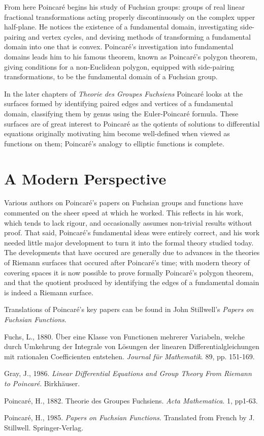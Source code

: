 \documentclass[12pt]{article}
\begin{document}
From here Poincar\'e begins his study of Fuchsian groups: groups of real linear fractional transformations acting properly discontinuously on the complex upper half-plane. He notices the existence of a fundamental domain, investigating side-pairing and vertex cycles, and devising methods of transforming a fundamental domain into one that is convex. Poincar\'e's investigation into fundamental domains leads him to his famous theorem, known as Poincar\'e's polygon theorem, giving conditions for a non-Euclidean polygon, equipped with side-pairing transformations, to be the fundamental domain of a Fuchsian group.

In the later chapters of \emph{Theorie des Groupes Fuchsiens} Poincar\'e looks at the surfaces formed by identifying paired edges and vertices of a fundamental domain, classifying them by genus using the Euler-Poincar\'e formula. These surfaces are of great interest to Poincar\'e as the qotients of solutions to differential equations originally motivating him become well-defined when viewed as functions on them; Poincar\'e's analogy to elliptic functions is complete.

\section{A Modern Perspective}
Various authors on Poincar\'e's papers on Fuchsian groups and functions have commented on the sheer speed at which he worked. This reflects in his work, which tends to lack rigour, and occasionally assumes non-trivial results without proof. That said, Poincar\'e's fundamental ideas were entirely correct, and his work needed little major development to turn it into the formal theory studied today. The developments that have occured are generally due to advances in the theories of Riemann surfaces that occured after Poincar\'e's time; with modern theory of covering spaces it is now possible to prove formally Poincar\'e's polygon theorem, and that the quotient produced by identifying the edges of a fundamental domain is indeed a Riemann surface.


Translations of Poincar\'e's key papers can be found in John Stillwell's \emph{Papers on Fuchsian Functions}.

\begin{thebibliography}{99}

 Fuchs, L., 1880. \"Uber eine Klasse von Functionen mehrerer Variabeln, welche durch Umkehrung der Integrale von L\"osungen der linearen Differentialgleichungen mit rationalen Coefficienten entstehen. \emph{Journal f\"ur Mathematik}. 89, pp. 151-169.

 Gray, J., 1986. \emph{Linear Differential Equations and Group Theory From Riemann to Poincar\'{e}}. Birkh\"{a}user.


 Poincar\'{e}, H., 1882. Theorie des Groupes Fuchsiens. \emph{Acta Mathematica}. 1, pp1-63.

 Poincar\'{e}, H., 1985. \emph{Papers on Fuchsian Functions}. Translated from French by J. Stillwell. Springer-Verlag.

\end{thebibliography}
\end{document}

